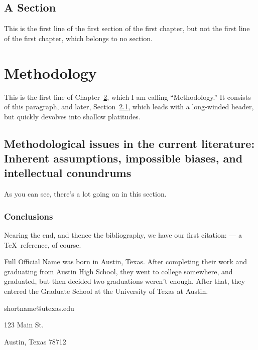 \documentclass{utexasthesis}
\begin{document}
\section{A Section}

This is the first line of the first section of the first chapter, but not the first line of the first chapter, which belongs to no section.


\chapter{Methodology}
\label{chap:methodology}

This is the first line of Chapter~\ref{chap:methodology}, which I am calling ``Methodology.''
It consists of this paragraph, and later, Section~\ref{sec:method-issues}, which leads with a long-winded header, but quickly devolves into shallow platitudes.

\section{Methodological issues in the current literature: Inherent assumptions, impossible biases, and intellectual conundrums}
\label{sec:method-issues}

As you can see, there's a lot going on in this section.

\subsection{Conclusions}

Nearing the end, and thence the bibliography, we have our first citation: \citet{knuth:texbook} --- a \TeX\ reference, of course.



\begin{vita}
  Full Official Name was born in Austin, Texas. After completing their work and graduating from Austin High School, they went to college somewhere, and graduated, but then decided two graduations weren't enough.
  After that, they entered the Graduate School at the University of Texas at Austin.

  \begin{address}
    shortname@utexas.edu

    123 Main St.

    Austin, Texas 78712
  \end{address}

\end{vita}
\end{document}
